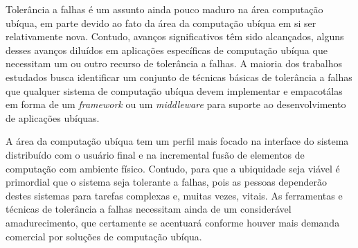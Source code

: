 Tolerância a falhas é um assunto ainda pouco maduro na área computação ubíqua, em parte devido ao fato da área da computação ubíqua em si ser relativamente nova. Contudo, avanços significativos têm sido alcançados, alguns desses avanços diluídos em aplicações específicas de computação ubíqua que necessitam um ou outro recurso de tolerância a falhas. A maioria dos trabalhos estudados busca identificar um conjunto de técnicas básicas de tolerância a falhas que qualquer sistema de computação ubíqua devem implementar e empacotálas em forma de um \emph{framework} ou um \emph{middleware} para suporte ao desenvolvimento de aplicações ubíquas.

A área da computação ubíqua tem um perfil mais focado na interface do sistema distribuído com o usuário final e na incremental fusão de elementos de computação com ambiente físico. Contudo, para que a ubiquidade seja viável é primordial que o sistema seja tolerante a falhas, pois as pessoas dependerão destes sistemas para tarefas complexas e, muitas vezes, vitais. As ferramentas e técnicas de tolerância a falhas necessitam ainda de um considerável amadurecimento, que certamente se acentuará conforme houver mais demanda comercial por soluções de computação ubíqua.